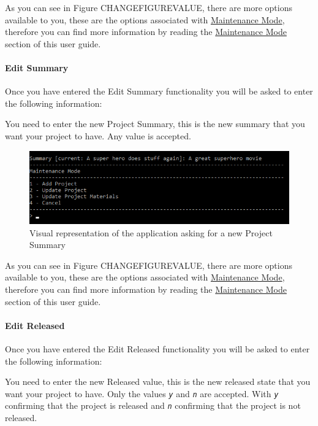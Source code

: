 \documentclass[
  english,
  a4paper,
,tablecaptionabove
]{scrartcl}
\begin{document}
As you can see in Figure CHANGEFIGUREVALUE, there are more options
available to you, these are the options associated with
\protect\hyperlink{using-maintenance-mode}{Maintenance Mode}, therefore
you can find more information by reading the
\protect\hyperlink{using-maintenance-mode}{Maintenance Mode} section of
this user guide.

\newpage

\hypertarget{edit-summary}{%
\paragraph{Edit Summary}\label{edit-summary}}

Once you have entered the Edit Summary functionality you will be asked
to enter the following information:

You need to enter the new Project Summary, this is the new summary that
you want your project to have. Any value is accepted.

\begin{figure}
\centering
\includegraphics{images/user-guide/maintenance-mode/update-project-summary.png}
\caption{Visual representation of the application asking for a new
Project Summary}
\end{figure}

As you can see in Figure CHANGEFIGUREVALUE, there are more options
available to you, these are the options associated with
\protect\hyperlink{using-maintenance-mode}{Maintenance Mode}, therefore
you can find more information by reading the
\protect\hyperlink{using-maintenance-mode}{Maintenance Mode} section of
this user guide.

\newpage

\hypertarget{edit-released}{%
\paragraph{Edit Released}\label{edit-released}}

Once you have entered the Edit Released functionality you will be asked
to enter the following information:

You need to enter the new Released value, this is the new released state
that you want your project to have. Only the values \emph{\texttt{y}}
and \emph{\texttt{n}} are accepted. With \emph{\texttt{y}} confirming
that the project is released and \emph{\texttt{n}} confirming that the
project is not released.
\end{document}

